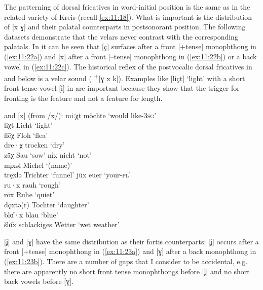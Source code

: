  The patterning of dorsal fricatives in word-initial position is the same as in the related variety of Kreis  (recall \ref{ex:11:18}). What is important is the distribution of [x ɣ] and their palatal counterparts in postsonorant position. The following datasets demonstrate that the velars never contrast with the corresponding palatals. In  it can be seen that [ç] surfaces after a front [+tense] monophthong in (\ref{ex:11:22a}) and [x] after a front [--tense] monophthong in (\ref{ex:11:22b}) or a back vowel in (\ref{ex:11:22c}). The historical reflex of the postvocalic dorsal fricatives in  and below is a velar sound ( \textsuperscript{+}[ɣ x k]). Examples like [liçt] ‘light’ with a short front tense vowel [i] in  are important because they show that the trigger for fronting is the  feature and not a feature for length.

\ea%
\label{ex:11:22}\relax[ç] and [x] (from /x/):
\ea\label{ex:11:22a} miːχt \tab [miːçt] \tab möchte \tab ‘would like-\textsc{3}\textsc{sg}’ \\
    liχt \tab [liçt] \tab Licht \tab ‘light’ \\
    flēχ \tab [fleːç] \tab Floh \tab ‘flea’ \\
    dre·χ \tab [dre·ç] \tab trocken \tab ‘dry’ \\
    zǟχ \tab [zæːç] \tab Sau \tab ‘sow’ 
\ex\label{ex:11:22b} n\k{i}x \tab  [nɪx] \tab nicht \tab ‘not’ \\
    m\k{i}xəl \tab [mɪxəl] \tab Michel \tab ‘(name)’ \\
    tręxlə \tab [trɛxlə] \tab Trichter \tab ‘funnel’ 
\ex\label{ex:11:22c} jūx \tab [ʝuːx] \tab euer \tab ‘your-\textsc{pl}’ \\
    ru·x \tab [ru·x] \tab rauh \tab ‘rough’ \\
    rōx \tab [roːx] \tab Ruhe \tab ‘quiet’ \\
    dǫxtə(r) \tab [dɔxtə(r)] \tab Tochter \tab ‘daughter’ \\
    blɑ̊·x \tab [bla·x] \tab blau \tab ‘blue’ \\
    šlɑ̄x \tab [ʃlɑːx] \tab  schlackiges Wetter \tab ‘wet weather’ 
\z 
\z 

[ʝ] and [ɣ] have the same distribution as their fortis counterparts: [ʝ] occurs after a front [+tense] monophthong in (\ref{ex:11:23a}) and [ɣ] after a back monophthong in (\ref{ex:11:23b}). There are a number of gaps that I consider to be accidental, e.g. there are apparently no short front tense monophthongs before [ʝ] and no short back vowels before [ɣ].

